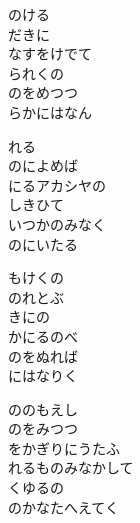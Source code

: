 \documentclass[10pt,b5j]{tarticle} %
\begin{document}
\vspace{1.5em} %
\newcommand{\linespace}{0.5em} %
\newcommand{\blocksize}{0.5\hsize} %
\begin{enumerate} %
    \begin{minipage}[c]{\blocksize}
    
        \vspace{\linespace}
        \item
        のける\\
        だきに\\
        なすをけでて\\
        られくの\\
        のをめつつ\\
        らかにはなん
        
        \vspace{\linespace}
        \item
        れる\\
        のによめば\\
        にるアカシヤの\\
        しきひて\\
        いつかのみなく\\
        のにいたる
        
        \vspace{\linespace}
        \item
        もけくの\\
        のれとぶ\\
        きにの\\
        かにるのべ\\
        のをぬれば\\
        にはなりく
        
        \vspace{\linespace}
        \item
        ののもえし\\
        のをみつつ\\
        をかぎりにうたふ\\
        れるものみなかして\\
        くゆるの\\
        のかなたへえてく
        

\end{minipage}
\end{enumerate}
\end{document}
